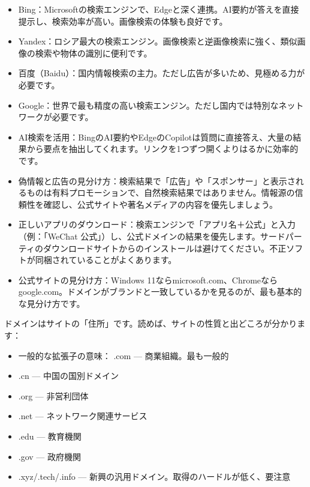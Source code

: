 
\begin{itemize}
  \item Bing：Microsoftの検索エンジンで、Edgeと深く連携。AI要約が答えを直接提示し、検索効率が高い。画像検索の体験も良好です。
  \item Yandex：ロシア最大の検索エンジン。画像検索と逆画像検索に強く、類似画像の検索や物体の識別に便利です。
  \item 百度（Baidu）：国内情報検索の主力。ただし広告が多いため、見極める力が必要です。
  \item Google：世界で最も精度の高い検索エンジン。ただし国内では特別なネットワークが必要です。
\end{itemize}


\begin{itemize}
  \item AI検索を活用：BingのAI要約やEdgeのCopilotは質問に直接答え、大量の結果から要点を抽出してくれます。リンクを1つずつ開くよりはるかに効率的です。
  \item 偽情報と広告の見分け方：検索結果で「広告」や「スポンサー」と表示されるものは有料プロモーションで、自然検索結果ではありません。情報源の信頼性を確認し、公式サイトや著名メディアの内容を優先しましょう。
  \item 正しいアプリのダウンロード：検索エンジンで「アプリ名＋公式」と入力（例：「WeChat 公式」）し、公式ドメインの結果を優先します。サードパーティのダウンロードサイトからのインストールは避けてください。不正ソフトが同梱されていることがよくあります。
  \item 公式サイトの見分け方：Windows 11ならmicrosoft.com、Chromeならgoogle.com。ドメインがブランドと一致しているかを見るのが、最も基本的な見分け方です。
\end{itemize}


ドメインはサイトの「住所」です。読めば、サイトの性質と出どころが分かります：

\begin{itemize}
  \item 一般的な拡張子の意味： .com — 商業組織。最も一般的
  \item .cn — 中国の国別ドメイン
  \item .org — 非営利団体
  \item .net — ネットワーク関連サービス
  \item .edu — 教育機関
  \item .gov — 政府機関
  \item .xyz/.tech/.info — 新興の汎用ドメイン。取得のハードルが低く、要注意
\end{itemize}

